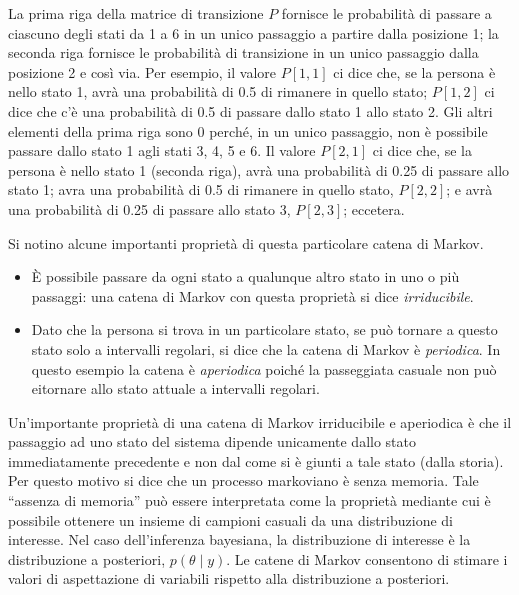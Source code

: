 \documentclass[
  11pt,
]{krantz}
\providecommand{\tightlist}{%
  \setlength{\itemsep}{0pt}\setlength{\parskip}{0pt}}
\theoremstyle{definition}
\theoremstyle{definition}
\theoremstyle{definition}
\theoremstyle{definition}
\theoremstyle{remark}
\begin{document}
\hfill\break

La prima riga della matrice di transizione \(P\) fornisce le probabilità di passare a ciascuno degli stati da 1 a 6 in un unico passaggio a partire dalla posizione 1; la seconda riga fornisce le probabilità di transizione in un unico passaggio dalla posizione 2 e così via. Per esempio, il valore \(P[1, 1]\) ci dice che, se la persona è nello stato 1, avrà una probabilità di 0.5 di rimanere in quello stato; \(P[1, 2]\) ci dice che c'è una probabilità di 0.5 di passare dallo stato 1 allo stato 2. Gli altri elementi della prima riga sono 0 perché, in un unico passaggio, non è possibile passare dallo stato 1 agli stati 3, 4, 5 e 6. Il valore \(P[2, 1]\) ci dice che, se la persona è nello stato 1 (seconda riga), avrà una probabilità di 0.25 di passare allo stato 1; avra una probabilità di 0.5 di rimanere in quello stato, \(P[2, 2]\); e avrà una probabilità di 0.25 di passare allo stato 3, \(P[2, 3]\); eccetera.

Si notino alcune importanti proprietà di questa particolare catena di Markov.

\begin{itemize}
\tightlist
\item
  È possibile passare da ogni stato a qualunque altro stato in uno o più passaggi: una catena di Markov con questa proprietà si dice \emph{irriducibile}.
\item
  Dato che la persona si trova in un particolare stato, se può tornare a questo stato solo a intervalli regolari, si dice che la catena di Markov è \emph{periodica}. In questo esempio la catena è \emph{aperiodica} poiché la passeggiata casuale non può eitornare allo stato attuale a intervalli regolari.
\end{itemize}

Un'importante proprietà di una catena di Markov irriducibile e aperiodica è che il passaggio ad uno stato del sistema dipende unicamente dallo stato immediatamente precedente e non dal come si è giunti a tale stato (dalla storia). Per questo motivo si dice che un processo markoviano è senza memoria. Tale ``assenza di memoria'' può essere interpretata come la proprietà mediante cui è possibile ottenere un insieme di campioni casuali da una distribuzione di interesse. Nel caso dell'inferenza bayesiana, la distribuzione di interesse è la distribuzione a posteriori, \(p(\theta \mid y)\). Le catene di Markov consentono di stimare i valori di aspettazione di variabili rispetto alla distribuzione a posteriori.
\end{document}
